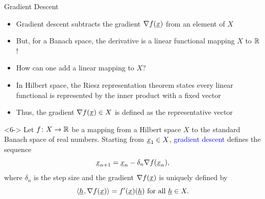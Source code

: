 \documentclass[10pt,letterpaper,english]{beamer}
\newcommand{\backupbegin}{
   \newcounter{finalframe}
   \setcounter{finalframe}{\value{framenumber}}
}
\newcommand{\backupend}{
   \setcounter{framenumber}{\value{finalframe}}
}
\begin{document}
\begin{frame}{Gradient Descent}

\begin{itemize}
\item<1-> Gradient descent subtracts the gradient $\nabla f(\underline{x})$ from an element of $X\!\!\!$ \vspace{1mm}

\item<2-> But, for a Banach space, the derivative is a linear functional mapping $X$ to $\mathbb{R}$!

\item<3-> How can one add a linear mapping to $X$?

\item<4-> In Hilbert space, the Riesz representation theorem states every linear functional is represented by the inner product with a fixed vector

\item<5-> Thus, the gradient $\nabla f (\underline{x}) \in X$ is defined as the representative vector
\end{itemize}

\begin{definition}<6->
Let $f \colon X \rightarrow \mathbb{R}$ be a mapping from a Hilbert space $X$ to the standard Banach space of real numbers.
Starting from $\underline{x}_1 \in X$, \textcolor{blue}{gradient descent} defines the sequence \vspace{-4mm}
\[ \underline{x}_{n+1} = \underline{x}_n - \delta_n \nabla f(\underline{x}_n), \]
where $\delta_n$ is the step size and the gradient $\nabla f (\underline{x})$ is uniquely defined by \vspace{-1.5mm}
\[{\langle  \underline{h}  \mskip1mu ,  \nabla f(\underline{x})  \rangle} = f'(\underline{x})(\underline{h}) \text{ for all } \underline{h} \in X. \]
\end{definition}


\end{frame}


\backupbegin


%
%

\backupend
\end{document}
